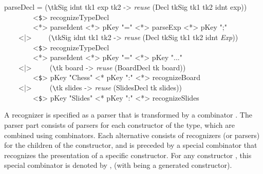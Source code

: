 \ttfamily \begin{small} \begin{tabbing}
parseDecl = (\verb|\|tkSig idnt tk1 exp tk2 -> {\em reuse} (Decl tkSig tk1 tk2 idnt exp))\\
~~~~~~~~<\verb|$|> recognizeTypeDecl\\
~~~~~~~~<*> parseIdent <*> pKey "=" <*> parseExp <*> pKey ";"\\
~~~~<|>~~~~ (\verb|\|tkSig idnt tk1 tk2 -> {\em reuse} (Decl tkSig tk1 tk2 idnt {\em Exp}))\\
~~~~~~~~<\verb|$|> recognizeTypeDecl\\
~~~~~~~~<*> parseIdent <*> pKey "=" <*> pKey "..."\\
~~~~<|>~~~~~(\verb|\|tk board -> {\em reuse} (BoardDecl tk board))\\
~~~~~~~~<\verb|$|> pKey "Chess" <* pKey ":" <*> recognizeBoard\\
~~~~<|>~~~~~(\verb|\|tk slides -> {\em reuse} (SlidesDecl tk slides))\\
~~~~~~~~<\verb|$|> pKey "Slides" <* pKey ":" <*> recognizeSlides
\end{tabbing} \end{small} \rmfamily
{}






A recognizer is specified as a parser that is transformed by a combinator . The parser part consists of parsers for each constructor of the type, which are combined using \p{<|>} combinators. Each alternative consists of recognizers (or parsers) for the children of the constructor, and is preceded by a special combinator that recognizes the presentation of a specific constructor. For any constructor , this special combinator is denoted by , (with  being a generated constructor).

